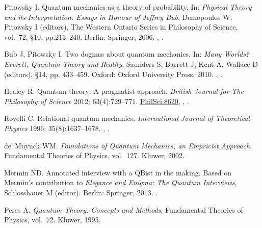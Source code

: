 \documentclass[DIV=calc,paper=a4,fontsize=11pt,twocolumn]{scrartcl} %
\theoremstyle{definition}
\theoremstyle{plain}
\begin{document}
\begin{thebibliography}{10}
Pitowsky I.
\newblock Quantum mechanics as a theory of probability.
\newblock In: \emph{Physical Theory and
its Interpretation: Essays in Honour of Jeffrey Bub}, Demopoulos W, Pitowsky I (editors), The
Western Ontario Series in Philosophy of Science, vol.~72, \S 10, pp.213--240.
Berlin: Springer, 2006.
\newblock \href {http://arxiv.org/abs/quant-ph/0510095}{},
\newblock \href {http://dx.doi.org/10.1007/1-4020-4876-9_10}{}.

Bub J, Pitowsky I.
\newblock Two dogmas about quantum mechanics.
\newblock In: {\em
{Many Worlds? Everett, Quantum Theory and Reality}}, Saunders S, Barrett J, Kent A, Wallace D (editors), \S 14, pp.
433--459. Oxford: Oxford University Press, 2010.
\newblock \href {http://arxiv.org/abs/0712.4258} {},
\href {http://dx.doi.org/10.1093/acprof:oso/9780199560561.003.0016}
{}.

Healey R.
\newblock Quantum theory: A pragmatist approach.
\newblock \emph{British Journal for The Philosophy of Science} 2012; 63(4):729--771.
\newblock \href{http://philsci-archive.pitt.edu/8620/}{PhilSci:8620},
\newblock \href {http://arxiv.org/abs/1008.3896} {},
\href {http://dx.doi.org/10.1093/bjps/axr054}
{}.

Rovelli C.
\newblock Relational quantum mechanics.
\newblock \emph{International Journal of Theoretical Physics} 1996; 35(8):1637--1678.
\newblock \href {http://arxiv.org/abs/quant-ph/9609002}
{}, \href {http://dx.doi.org/10.1007/BF02302261}
{}.

de~Muynck WM.
\newblock \emph{Foundations of Quantum Mechanics, an Empricist Approach}. Fundamental Theories of Physics, vol.~127.
\newblock Kluwer, 2002.

Mermin ND.
\newblock Annotated interview with a QBist in the making.
\newblock Based on Mermin's contribution to
\emph{Elegance and Enigma: The Quantum Interviews}, Schlosshauer M (editor). Berlin: Springer, 2013.
\newblock \href {http://arxiv.org/abs/1301.6551} {}.

Peres A.
\newblock \emph{Quantum Theory: Concepts and Methods}. Fundamental Theories of Physics, vol.~72.
\newblock Kluwer, 1995.


\end{thebibliography}
\end{document}
